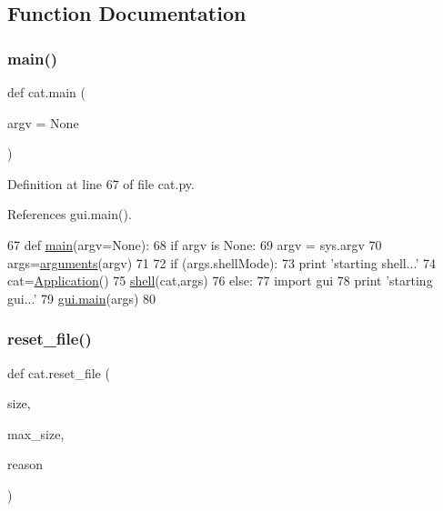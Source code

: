 \subsection{Function Documentation}
\mbox{\label{namespacecat_a1d47acf33be14b333391a3a1478cf147}} 
\subsubsection{\texorpdfstring{main()}{main()}}
{\footnotesize\ttfamily def cat.\+main (\begin{DoxyParamCaption}\item[{}]{argv = {\ttfamily None} }\end{DoxyParamCaption})}



Definition at line 67 of file cat.\+py.



References gui.\+main().


\begin{DoxyCode}
67 \textcolor{keyword}{def }\hyperlink{Server__NI6008_8cpp_a0ddf1224851353fc92bfbff6f499fa97}{main}(argv=None):
68   \textcolor{keywordflow}{if} argv \textcolor{keywordflow}{is} \textcolor{keywordtype}{None}:
69     argv = sys.argv
70     args=\hyperlink{namespacearguments}{arguments}(argv)
71 
72   \textcolor{keywordflow}{if} (args.shellMode):
73     \textcolor{keywordflow}{print} \textcolor{stringliteral}{'starting shell...'}
74     cat=\hyperlink{classApplication}{Application}()
75     \hyperlink{namespaceshell}{shell}(cat,args)
76   \textcolor{keywordflow}{else}:
77     \textcolor{keyword}{import} gui
78     \textcolor{keywordflow}{print} \textcolor{stringliteral}{'starting gui...'}
79     \hyperlink{namespacegui_a24d9f88c60ee52fd5381ea6f83ca2adb}{gui.main}(args)
80 
\end{DoxyCode}
\mbox{\label{namespacecat_ae0aa242aa488082b980de81f7a588f5e}} 
\subsubsection{\texorpdfstring{reset\+\_\+file()}{reset\_file()}}
{\footnotesize\ttfamily def cat.\+reset\+\_\+file (\begin{DoxyParamCaption}\item[{}]{size,  }\item[{}]{max\+\_\+size,  }\item[{}]{reason }\end{DoxyParamCaption})}



